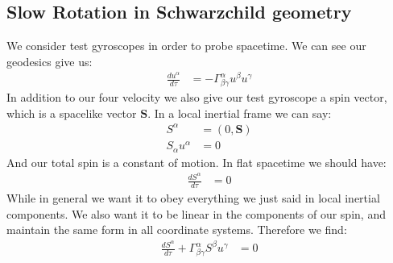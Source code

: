 \subsection{Slow Rotation in Schwarzchild geometry}
We consider test gyroscopes in order to probe spacetime. We can see our geodesics give us:
\begin{align*}
	\frac{d u^\alpha}{d\tau} &= -\Gamma_{\beta\gamma}^\alpha u^\beta u^\gamma
\end{align*}
In addition to our four velocity we also give our test gyroscope a spin vector, which is a spacelike vector $\bm{S}$. In a local inertial frame we can say:
\begin{align*}
	S^\alpha &= (0,\bm{S}) \\
	S_\alpha u^\alpha &= 0
\end{align*}
And our total spin is a constant of motion. In flat spacetime we should have:
\begin{align*}
	\frac{dS^\alpha}{d\tau} &= 0
\end{align*}
While in general we want it to obey everything we just said in local inertial components. We also want it to be linear in the components of our spin, and maintain the same form in all coordinate systems. Therefore we find:
\begin{align*}
	\frac{dS^\alpha}{d\tau} + \Gamma^\alpha_{\beta\gamma} S^\beta u^\gamma &= 0
\end{align*}

